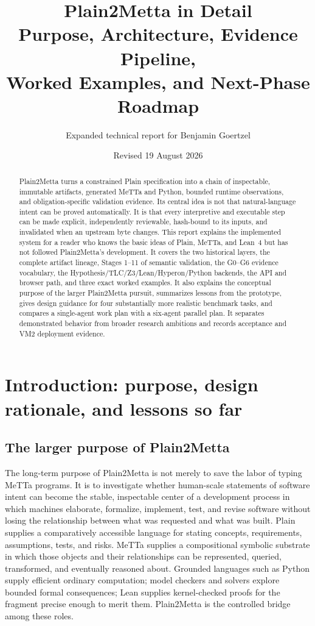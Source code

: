 \documentclass[11pt]{article}
\title{Plain2Metta in Detail\\Purpose, Architecture, Evidence Pipeline,\\Worked Examples, and Next-Phase Roadmap}
\author{Expanded technical report for Benjamin Goertzel}
\date{Revised 19 August 2026}
\begin{document}
\maketitle

\begin{abstract}
Plain2Metta turns a constrained Plain specification into a chain of
inspectable, immutable artifacts, generated MeTTa and Python, bounded runtime
observations, and obligation-specific validation evidence.  Its central idea
is not that natural-language intent can be proved automatically.  It is that
every interpretive and executable step can be made explicit, independently
reviewable, hash-bound to its inputs, and invalidated when an upstream byte
changes.  This report explains the implemented system for a reader who knows
the basic ideas of Plain, MeTTa, and Lean~4 but has not followed Plain2Metta's
development.  It covers the two historical layers, the complete artifact
lineage, Stages 1--11 of semantic validation, the G0--G6 evidence vocabulary,
the Hypothesis/TLC/Z3/Lean/Hyperon/Python backends, the API and browser path,
and three exact worked examples.  It also explains the conceptual purpose of
the larger Plain2Metta pursuit, summarizes lessons from the prototype, gives
design guidance for four substantially more realistic benchmark tasks, and
compares a single-agent work plan with a six-agent parallel plan.  It
separates demonstrated behavior from broader research ambitions and records
acceptance and VM2 deployment evidence.
\end{abstract}

\tableofcontents
\newpage

\section{Introduction: purpose, design rationale, and lessons so far}

\subsection{The larger purpose of Plain2Metta}

The long-term purpose of Plain2Metta is not merely to save the labor of typing
MeTTa programs.  It is to investigate whether human-scale statements of
software intent can become the stable, inspectable center of a development
process in which machines elaborate, formalize, implement, test, and revise
software without losing the relationship between what was requested and what
was built.  Plain supplies a comparatively accessible language for stating
concepts, requirements, assumptions, tests, and risks.  MeTTa supplies a
compositional symbolic substrate in which those objects and their
relationships can be represented, queried, transformed, and eventually
reasoned about.  Grounded languages such as Python supply efficient ordinary
computation; model checkers and solvers explore bounded formal consequences;
Lean supplies kernel-checked proofs for the fragment precise enough to merit
them.  Plain2Metta is the controlled bridge among these roles.
\end{document}
